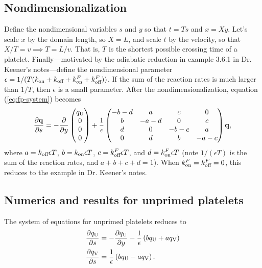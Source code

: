 \documentclass{article}
\newcommand{\tn}{\textnormal}
\newcommand{\Pder}[2]{\frac{\partial #1}{\partial #2}}
\begin{document}
\subsection{Nondimensionalization}
\label{sec:nondim}

Define the nondimensional variables $s$ and $y$ so that $t = Ts$ and
$x = Xy$. Let's scale $x$ by the domain length, so $X = L$, and scale
$t$ by the velocity, so that $X/T = v \implies T = L/v$. That is, $T$
is the shortest possible crossing time of a
platelet. Finally---motivated by the adiabatic reduction in example
3.6.1 in Dr. Keener's notes---define the nondimensional parameter
$\epsilon = 1/(T(k_\tn{on} + k_\tn{off} + k_\tn{on}^F +
k_\tn{off}^F))$. If the sum of the reaction rates is much larger than
$1/T$, then $\epsilon$ is a small parameter. After the
nondimensionalization, equation (\ref{eq:fp-system}) becomes
\begin{equation}
  \label{eq:nd-system}
  \Pder{\mathbf{q}}{s} = -\Pder{}{y}
  \begin{pmatrix}
    q_\tn{U} \\ 0 \\ 0 \\ 0
  \end{pmatrix}
  + \frac{1}{\epsilon}
  \begin{pmatrix}
    - b - d & a & c & 0 \\
    b & - a - d & 0 & c \\
    d & 0 & - b - c & a \\
    0 & d & b & - a - c
  \end{pmatrix}
  \mathbf{q},
\end{equation}
where $a = k_\tn{off} \epsilon T$, $b = k_\tn{on} \epsilon T$, $c =
k_\tn{off}^F \epsilon T$, and $d = k_\tn{on}^F \epsilon T$ (note
$1/(\epsilon T)$ is the sum of the reaction rates, and $a + b + c + d
= 1$). When $k_\tn{on}^F = k_\tn{off}^F = 0$, this reduces to the
example in Dr. Keener's notes.

\subsection{Numerics and results for unprimed platelets}
\label{sec:res-unpr}

The system of equations for unprimed platelets reduces to
\begin{align}
  \label{eq:unprimed-1}
  \Pder{q_\tn{U}}{s} &= -\Pder{q_\tn{U}}{y} - \frac{1}{\epsilon}
                       \left(b q_\tn{U} + a q_\tn{V}\right) \\
  \label{eq:unprimed-2}
  \Pder{q_\tn{V}}{s} &= \frac{1}{\epsilon} \left(b q_\tn{U} - a
                       q_\tn{V}\right).
\end{align}
\end{document}

